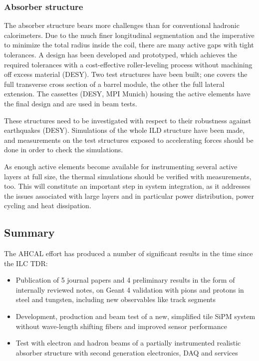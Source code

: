 \subsubsection{Absorber structure}

The absorber structure bears more challenges than for conventional hadronic calorimeters. Due to the much finer longitudinal segmentation and the imperative to minimize the total radius inside the coil, there are many active gaps with tight tolerances. A design has been developed and prototyped, which achieves the required tolerances with a cost-effective roller-leveling process without machining off excess material (DESY). Two test structures have been built; one covers the full transverse cross section of a barrel module, the other the full lateral extension. The cassettes (DESY, MPI Munich) housing the active elements have the final design and are used in beam tests.

These structures need to be investigated with respect to their robustness against earthquakes (DESY). Simulations of the whole ILD structure have been made, and measurements on the test structures exposed to accelerating forces should be done in order to check the simulations.

As enough active elements become available for instrumenting several active layers at full size, the thermal simulations should be verified with measurements, too. This will constitute an important step in system integration, as it addresses the issues associated with large layers and in particular power distribution, power cycling and heat dissipation.

\subsection{Summary}
The AHCAL effort has produced a number of significant results in the time since the ILC TDR:
\begin{itemize}
\item Publication of 5 journal papers and 4 preliminary results in the form of internally reviewed notes, on Geant 4 validation with pions and protons in steel and tungsten, including new observables like track segments
\item Development, production and beam test of a new, simplified tile SiPM system without wave-length shifting fibers and improved sensor performance
\item Test with electron and hadron beams of a partially instrumented realistic absorber structure  with second generation electronics, DAQ and services
\end{itemize}

